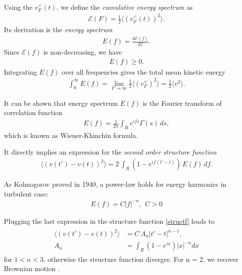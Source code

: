 Using the $v_F^{<}(t)$, we define the \textit{cumulative energy spectrum} as
\begin{align*}
\mathcal{E}(F) = \frac{1}{2} \langle (v_F^{<}(t))^2 \rangle.
\end{align*}
Its derivation is the \textit{energy spectrum}
\begin{align*}
E(f) = \frac{d\mathcal{E}(f)}{df}.
\end{align*}
Since $\mathcal{E}(f)$ is non-decreasing, we have
\begin{align*}
E(f) \geq 0.
\end{align*}
Integrating  $E(f)$ over all frequencies gives the total mean kinetic energy
\begin{align}
\int_0^{\infty} E(f) = \lim_{F \to \infty} \frac{1}{2} \langle (v_F^{<})^2 \rangle = \frac{1}{2} \langle v^2 \rangle.
\end{align}

It can be shown that energy spectrum $E(f)$ is the Fourier transform of correlation function
\begin{align*} 
E(f)  = \frac{1}{2 \pi} \int_{R} e^{ifs} \Gamma(s) \,ds,
\end{align*}
which is known as Wiener-Khinchin formula.

It directly implies an expression for the \textit{second order structure function}
\begin{align}\label{structf}
\langle (v(t') - v(t))^2 \rangle = 2 \, \int_{R} (1 - e^{if(t' - t)}) \, E(f) \, df.
\end{align}

As Kolmogorov proved in 1940, a power-law holds for energy harmonics in turbulent case:
\begin{align}
E(f) = C |f|^{-n}, ~~ C>0
\end{align}

Plugging the last expression in the structure function \ref{structf} leads to
\begin{align} \label{Brown}
\begin{split}
\langle (v(t') - v(t))^2 \rangle &= C\,A_n |t' - t|^{n-1}, \\
A_n &= \int_R (1-e^{ix}) |x|^{-n} dx
\end{split}
\end{align}
for $1 < n < 3$, otherwise the structure function diverges. For n = 2, we recover Brownian motion \cite{tur}.